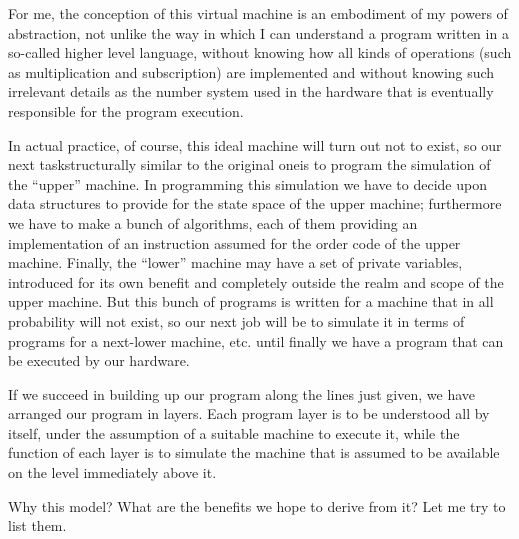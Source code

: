 For me, the conception of this virtual machine is an embodiment of my powers of abstraction, not unlike the way in which I can understand a program written in a so-called higher level language, without knowing how all kinds of operations (such as multiplication and subscription) are implemented and without knowing such irrelevant details as the number system used in the hardware that is eventually responsible for the program execution.

In actual practice, of course, this ideal machine will turn out not to exist, so our next task\textemdash{}structurally similar to the original one\textemdash{}is to program the simulation of the ``upper'' machine. In programming this simulation we have to decide upon data structures to provide for the state space of the upper machine; furthermore we have to make a bunch of algorithms, each of them providing an implementation of an instruction assumed for the order code of the upper machine. Finally, the ``lower'' machine may have a set of private variables, introduced for its own benefit and completely outside the realm and scope of the upper machine. But this bunch of programs is written for a machine that in all probability will not exist, so our next job will be to simulate it in terms of programs for a next-lower machine, etc. until finally we have a program that can be executed by our hardware.

If we succeed in building up our program along the lines just given, we have arranged our program in layers. Each program layer is to be understood all by itself, under the assumption of a suitable machine to execute it, while the function of each layer is to simulate the machine that is assumed to be available on the level immediately above it.

Why this model? What are the benefits we hope to derive from it? Let me try to list them.

